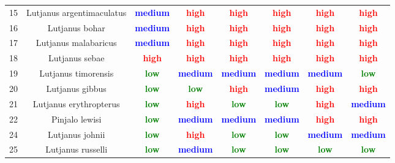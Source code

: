 \documentclass{report}\usepackage[]{graphicx}\usepackage[]{color}
\begin{document}
\begin{table}[ht]
{\begin{tabular}{cccccccc}
   15 & Lutjanus argentimaculatus & \textcolor{blue}{\textbf{medium}} & \textcolor{red}{\textbf{high}} & \textcolor{red}{\textbf{high}} & \textcolor{red}{\textbf{high}} & \textcolor{red}{\textbf{high}} & \textcolor{red}{\textbf{high}} \\ 
   16 & Lutjanus bohar & \textcolor{blue}{\textbf{medium}} & \textcolor{red}{\textbf{high}} & \textcolor{red}{\textbf{high}} & \textcolor{red}{\textbf{high}} & \textcolor{red}{\textbf{high}} & \textcolor{red}{\textbf{high}} \\ 
   17 & Lutjanus malabaricus & \textcolor{blue}{\textbf{medium}} & \textcolor{red}{\textbf{high}} & \textcolor{red}{\textbf{high}} & \textcolor{red}{\textbf{high}} & \textcolor{red}{\textbf{high}} & \textcolor{red}{\textbf{high}} \\ 
   18 & Lutjanus sebae & \textcolor{red}{\textbf{high}} & \textcolor{red}{\textbf{high}} & \textcolor{red}{\textbf{high}} & \textcolor{red}{\textbf{high}} & \textcolor{red}{\textbf{high}} & \textcolor{red}{\textbf{high}} \\ 
   19 & Lutjanus timorensis & \textcolor{green}{\textbf{low}} & \textcolor{blue}{\textbf{medium}} & \textcolor{blue}{\textbf{medium}} & \textcolor{blue}{\textbf{medium}} & \textcolor{blue}{\textbf{medium}} & \textcolor{green}{\textbf{low}} \\ 
   20 & Lutjanus gibbus & \textcolor{green}{\textbf{low}} & \textcolor{green}{\textbf{low}} & \textcolor{red}{\textbf{high}} & \textcolor{blue}{\textbf{medium}} & \textcolor{red}{\textbf{high}} & \textcolor{red}{\textbf{high}} \\ 
   21 & Lutjanus erythropterus & \textcolor{green}{\textbf{low}} & \textcolor{red}{\textbf{high}} & \textcolor{green}{\textbf{low}} & \textcolor{green}{\textbf{low}} & \textcolor{red}{\textbf{high}} & \textcolor{blue}{\textbf{medium}} \\ 
   22 & Pinjalo lewisi & \textcolor{green}{\textbf{low}} & \textcolor{blue}{\textbf{medium}} & \textcolor{blue}{\textbf{medium}} & \textcolor{blue}{\textbf{medium}} & \textcolor{red}{\textbf{high}} & \textcolor{red}{\textbf{high}} \\ 
   24 & Lutjanus johnii & \textcolor{green}{\textbf{low}} & \textcolor{red}{\textbf{high}} & \textcolor{green}{\textbf{low}} & \textcolor{green}{\textbf{low}} & \textcolor{blue}{\textbf{medium}} & \textcolor{blue}{\textbf{medium}} \\ 
   25 & Lutjanus russelli & \textcolor{green}{\textbf{low}} & \textcolor{blue}{\textbf{medium}} & \textcolor{green}{\textbf{low}} & \textcolor{green}{\textbf{low}} & \textcolor{green}{\textbf{low}} & \textcolor{green}{\textbf{low}} \\ 

\end{tabular}}
\end{table}
\end{document}
